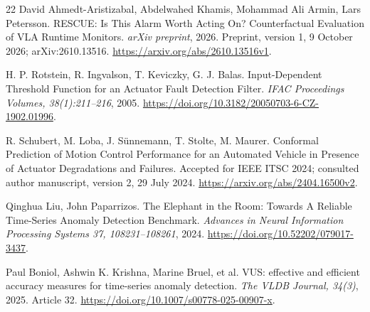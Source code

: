 \begin{thebibliography}{22}
 David Ahmedt-Aristizabal, Abdelwahed Khamis, Mohammad Ali Armin, Lars Petersson. {RESCUE: Is This Alarm Worth Acting On? Counterfactual Evaluation of VLA Runtime Monitors}. \emph{arXiv preprint}, 2026. Preprint, version 1, 9 October 2026; arXiv:2610.13516. \url{https://arxiv.org/abs/2610.13516v1}.

 H. P. Rotstein, R. Ingvalson, T. Keviczky, G. J. Balas. {Input-Dependent Threshold Function for an Actuator Fault Detection Filter}. \emph{IFAC Proceedings Volumes, 38(1):211--216}, 2005. \url{https://doi.org/10.3182/20050703-6-CZ-1902.01996}.

 R. Schubert, M. Loba, J. S\"unnemann, T. Stolte, M. Maurer. {Conformal Prediction of Motion Control Performance for an Automated Vehicle in Presence of Actuator Degradations and Failures}. Accepted for IEEE ITSC 2024; consulted author manuscript, version 2, 29 July 2024. \url{https://arxiv.org/abs/2404.16500v2}.

 Qinghua Liu, John Paparrizos. {The Elephant in the Room: Towards A Reliable Time-Series Anomaly Detection Benchmark}. \emph{Advances in Neural Information Processing Systems 37, 108231--108261}, 2024. \url{https://doi.org/10.52202/079017-3437}.

 Paul Boniol, Ashwin K. Krishna, Marine Bruel, et al. {VUS: effective and efficient accuracy measures for time-series anomaly detection}. \emph{The VLDB Journal, 34(3)}, 2025. Article 32. \url{https://doi.org/10.1007/s00778-025-00907-x}.

\end{thebibliography}

